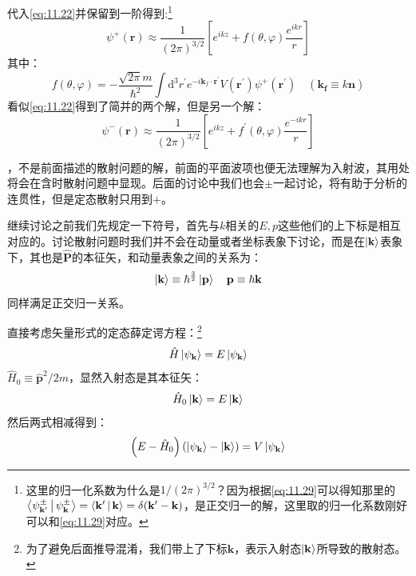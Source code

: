 \documentclass[a4paper,zihao=-4,linespread=1]{ctexrep}
\begin{document}
	代入\ref{eq:11.22}并保留到一阶得到:\footnote{这里的归一化系数为什么是$1/(2\pi)^{3/2}$？因为根据\ref{eq:11.29}可以得知那里的$\Braket{\psi^\pm_{\mathbf{k}^\prime}|\psi^\pm_{\mathbf{k}}}=\Braket{\mathbf{k}^\prime|\mathbf{k}}=\delta(\mathbf{k}^\prime-\mathbf{k})$，是正交归一的解，这里取的归一化系数刚好可以和\ref{eq:11.29}对应。}
	\begin{equation}
		\label{eq:11.24}
		\psi^+(\mathbf{r})\approx \frac{1}{(2\pi)^{3/2}}\left[e^{ikz}+f(\theta,\varphi)\frac{e^{ikr}}{r}\right]
	\end{equation}
	其中：
	\begin{equation}
		\label{eq:11.25}
		f(\theta,\varphi)=-\frac{\sqrt{2\pi}m}{\hbar^2}\int\mathrm{d}^3r^\prime e^{-i\mathbf{k}_f\cdot\mathbf{r}^\prime}V(\mathbf{r}^\prime)\psi^+(\mathbf{r^\prime})\quad (\mathbf{k_f}\equiv k\mathbf{n})
	\end{equation}
	看似\ref{eq:11.22}得到了简并的两个解，但是另一个解：
	\[\psi^-(\mathbf{r})\approx \frac{1}{(2\pi)^{3/2}}\left[e^{ikz}+f^\prime(\theta,\varphi)\frac{e^{-ikr}}{r}\right]\]
	
	，不是前面描述的散射问题的解，前面的平面波项也便无法理解为入射波，其用处将会在含时散射问题中显现。后面的讨论中我们也会$\pm$一起讨论，将有助于分析的连贯性，但是定态散射只用到$+$。

	继续讨论之前我们先规定一下符号，首先与$k$相关的$E,p$这些他们的上下标是相互对应的。讨论散射问题时我们并不会在动量或者坐标表象下讨论，而是在$\ket{\mathbf{k}}$表象下，其也是$\hat{\mathbf{P}}$的本征矢，和动量表象之间的关系为：
	\[\ket{\mathbf{k}}\equiv\hbar^{\frac{3}{2}}\ket{\mathbf{p}}\quad\mathbf{p}\equiv\hbar\mathbf{k}\]
	同样满足正交归一关系。
	
	直接考虑矢量形式的定态薛定谔方程：\footnote{为了避免后面推导混淆，我们带上了下标$\mathbf{k}$，表示入射态$\ket{\mathbf{k}}$所导致的散射态。}
	\begin{equation}
		\hat H\ket{\psi_\mathbf{k}}=E\ket{\psi_\mathbf{k}}
	\end{equation}
	$\hat{H}_0\equiv \hat{\mathbf{p}}^2/2m$，显然入射态是其本征矢：
	\begin{equation}
		\label{eq:11.27}
		\hat{H}_0\ket{\mathbf{k}}=E\ket{\mathbf{k}}
	\end{equation}
	然后两式相减得到：
	\begin{equation}
		\label{eq:11.28}
		\left(E-\hat{H}_0\right)\left(\ket{\psi_\mathbf{k}}-\ket{\mathbf{k}}\right)=V\ket{\psi_\mathbf{k}}
	\end{equation}
\end{document}
